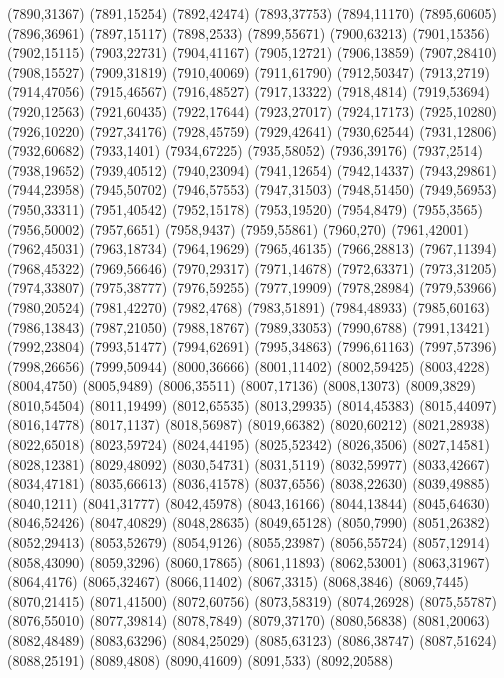 (7890,31367)
(7891,15254)
(7892,42474)
(7893,37753)
(7894,11170)
(7895,60605)
(7896,36961)
(7897,15117)
(7898,2533)
(7899,55671)
(7900,63213)
(7901,15356)
(7902,15115)
(7903,22731)
(7904,41167)
(7905,12721)
(7906,13859)
(7907,28410)
(7908,15527)
(7909,31819)
(7910,40069)
(7911,61790)
(7912,50347)
(7913,2719)
(7914,47056)
(7915,46567)
(7916,48527)
(7917,13322)
(7918,4814)
(7919,53694)
(7920,12563)
(7921,60435)
(7922,17644)
(7923,27017)
(7924,17173)
(7925,10280)
(7926,10220)
(7927,34176)
(7928,45759)
(7929,42641)
(7930,62544)
(7931,12806)
(7932,60682)
(7933,1401)
(7934,67225)
(7935,58052)
(7936,39176)
(7937,2514)
(7938,19652)
(7939,40512)
(7940,23094)
(7941,12654)
(7942,14337)
(7943,29861)
(7944,23958)
(7945,50702)
(7946,57553)
(7947,31503)
(7948,51450)
(7949,56953)
(7950,33311)
(7951,40542)
(7952,15178)
(7953,19520)
(7954,8479)
(7955,3565)
(7956,50002)
(7957,6651)
(7958,9437)
(7959,55861)
(7960,270)
(7961,42001)
(7962,45031)
(7963,18734)
(7964,19629)
(7965,46135)
(7966,28813)
(7967,11394)
(7968,45322)
(7969,56646)
(7970,29317)
(7971,14678)
(7972,63371)
(7973,31205)
(7974,33807)
(7975,38777)
(7976,59255)
(7977,19909)
(7978,28984)
(7979,53966)
(7980,20524)
(7981,42270)
(7982,4768)
(7983,51891)
(7984,48933)
(7985,60163)
(7986,13843)
(7987,21050)
(7988,18767)
(7989,33053)
(7990,6788)
(7991,13421)
(7992,23804)
(7993,51477)
(7994,62691)
(7995,34863)
(7996,61163)
(7997,57396)
(7998,26656)
(7999,50944)
(8000,36666)
(8001,11402)
(8002,59425)
(8003,4228)
(8004,4750)
(8005,9489)
(8006,35511)
(8007,17136)
(8008,13073)
(8009,3829)
(8010,54504)
(8011,19499)
(8012,65535)
(8013,29935)
(8014,45383)
(8015,44097)
(8016,14778)
(8017,1137)
(8018,56987)
(8019,66382)
(8020,60212)
(8021,28938)
(8022,65018)
(8023,59724)
(8024,44195)
(8025,52342)
(8026,3506)
(8027,14581)
(8028,12381)
(8029,48092)
(8030,54731)
(8031,5119)
(8032,59977)
(8033,42667)
(8034,47181)
(8035,66613)
(8036,41578)
(8037,6556)
(8038,22630)
(8039,49885)
(8040,1211)
(8041,31777)
(8042,45978)
(8043,16166)
(8044,13844)
(8045,64630)
(8046,52426)
(8047,40829)
(8048,28635)
(8049,65128)
(8050,7990)
(8051,26382)
(8052,29413)
(8053,52679)
(8054,9126)
(8055,23987)
(8056,55724)
(8057,12914)
(8058,43090)
(8059,3296)
(8060,17865)
(8061,11893)
(8062,53001)
(8063,31967)
(8064,4176)
(8065,32467)
(8066,11402)
(8067,3315)
(8068,3846)
(8069,7445)
(8070,21415)
(8071,41500)
(8072,60756)
(8073,58319)
(8074,26928)
(8075,55787)
(8076,55010)
(8077,39814)
(8078,7849)
(8079,37170)
(8080,56838)
(8081,20063)
(8082,48489)
(8083,63296)
(8084,25029)
(8085,63123)
(8086,38747)
(8087,51624)
(8088,25191)
(8089,4808)
(8090,41609)
(8091,533)
(8092,20588)
